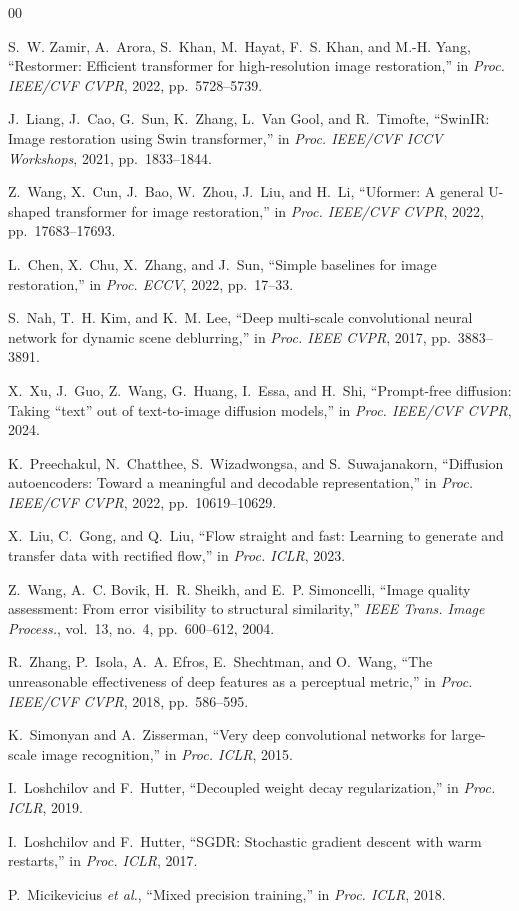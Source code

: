 \documentclass[conference]{IEEEtran}
\begin{document}
\begin{thebibliography}{00}
\footnotesize

 S.~W. Zamir, A.~Arora, S.~Khan, M.~Hayat, F.~S. Khan, and
M.-H. Yang, ``Restormer: Efficient transformer for high-resolution image
restoration,'' in \emph{Proc. IEEE/CVF CVPR}, 2022, pp.~5728--5739.

 J.~Liang, J.~Cao, G.~Sun, K.~Zhang, L.~Van Gool, and
R.~Timofte, ``SwinIR: Image restoration using Swin transformer,'' in
\emph{Proc. IEEE/CVF ICCV Workshops}, 2021, pp.~1833--1844.

 Z.~Wang, X.~Cun, J.~Bao, W.~Zhou, J.~Liu, and H.~Li,
``Uformer: A general U-shaped transformer for image restoration,'' in
\emph{Proc. IEEE/CVF CVPR}, 2022, pp.~17683--17693.

 L.~Chen, X.~Chu, X.~Zhang, and J.~Sun, ``Simple baselines for
image restoration,'' in \emph{Proc. ECCV}, 2022, pp.~17--33.

 S.~Nah, T.~H. Kim, and K.~M. Lee, ``Deep multi-scale
convolutional neural network for dynamic scene deblurring,'' in \emph{Proc.
IEEE CVPR}, 2017, pp.~3883--3891.

 X.~Xu, J.~Guo, Z.~Wang, G.~Huang, I.~Essa, and H.~Shi,
``Prompt-free diffusion: Taking ``text'' out of text-to-image diffusion
models,'' in \emph{Proc. IEEE/CVF CVPR}, 2024.

 K.~Preechakul, N.~Chatthee, S.~Wizadwongsa, and
S.~Suwajanakorn, ``Diffusion autoencoders: Toward a meaningful and decodable
representation,'' in \emph{Proc. IEEE/CVF CVPR}, 2022, pp.~10619--10629.

 X.~Liu, C.~Gong, and Q.~Liu, ``Flow straight and fast:
Learning to generate and transfer data with rectified flow,'' in \emph{Proc.
ICLR}, 2023.

 Z.~Wang, A.~C. Bovik, H.~R. Sheikh, and E.~P. Simoncelli,
``Image quality assessment: From error visibility to structural similarity,''
\emph{IEEE Trans. Image Process.}, vol.~13, no.~4, pp.~600--612, 2004.

 R.~Zhang, P.~Isola, A.~A. Efros, E.~Shechtman, and O.~Wang,
``The unreasonable effectiveness of deep features as a perceptual metric,'' in
\emph{Proc. IEEE/CVF CVPR}, 2018, pp.~586--595.

 K.~Simonyan and A.~Zisserman, ``Very deep convolutional networks
for large-scale image recognition,'' in \emph{Proc. ICLR}, 2015.

 I.~Loshchilov and F.~Hutter, ``Decoupled weight decay
regularization,'' in \emph{Proc. ICLR}, 2019.

 I.~Loshchilov and F.~Hutter, ``SGDR: Stochastic gradient descent
with warm restarts,'' in \emph{Proc. ICLR}, 2017.

 P.~Micikevicius \emph{et al.}, ``Mixed precision training,'' in
\emph{Proc. ICLR}, 2018.

\end{thebibliography}
\end{document}
